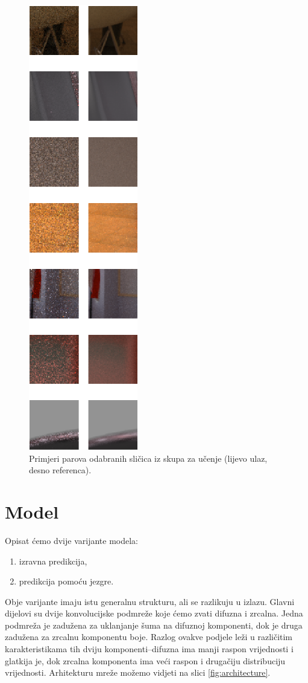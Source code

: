 \documentclass[times, utf8, seminar, numeric]{fer}
\begin{document}
\begin{figure}[H]
  \centering
  \includegraphics[scale=0.75]{samples_better.png}
  \caption{Primjeri parova odabranih sličica iz skupa za učenje (lijevo ulaz, desno referenca).}
  \label{fig:samples}
\end{figure}


\chapter{Model}
Opisat ćemo dvije varijante modela:
\begin{enumerate}
\item izravna predikcija,
\item predikcija pomoću jezgre.
\end{enumerate}

Obje varijante imaju istu generalnu strukturu, ali se razlikuju u izlazu. Glavni dijelovi su
dvije konvolucijske podmreže koje ćemo zvati difuzna i zrcalna. Jedna podmreža je zadužena za
uklanjanje šuma na difuznoj komponenti, dok je druga zadužena za zrcalnu komponentu boje. Razlog
ovakve podjele leži u različitim karakteristikama tih dviju komponenti--difuzna ima manji raspon
vrijednosti i glatkija je, dok zrcalna komponenta ima veći raspon i drugačiju distribuciju
vrijednosti. Arhitekturu mreže možemo vidjeti na slici \ref{fig:architecture}.
\end{document}
